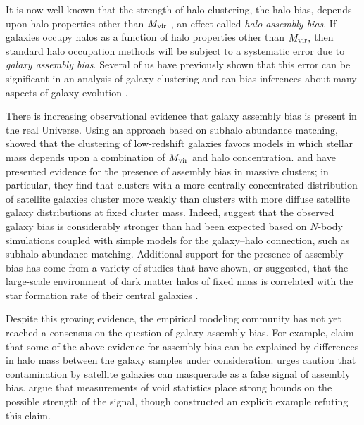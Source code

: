 \documentclass[usenatbib,usegraphicx,letterpaper]{mn2e}
\newcommand{\mvir}{M_{\rm vir}}
\begin{document}
It is now well known that the strength of halo clustering, the halo bias, 
depends upon halo properties other than $\mvir$
\citep[e.g.][]{gao_etal05,wechsler06,gao_white07,zentner07,dalal_etal08,lacerna11},
an effect called {\em halo assembly bias}. If galaxies occupy halos as a
function of halo properties other than $\mvir,$ then standard halo
occupation methods will be subject to a systematic error due to 
{\em galaxy assembly bias}. Several of us have previously shown 
that this error can be significant in an analysis of galaxy clustering 
and can bias inferences about many aspects of galaxy evolution \citep{zentner_etal14}.


There is increasing observational evidence that galaxy assembly bias is
present in the real Universe.
Using an approach based on subhalo abundance matching,
\citet{lehmann_etal15} showed that the clustering of low-redshift
galaxies favors models in which stellar mass depends upon a
combination of $\mvir$ and halo concentration.
\citet{miyatake_etal16} and \citet{more_etal16} have
presented evidence for the presence of assembly bias in massive
clusters; in particular, they find that clusters with a more centrally concentrated 
distribution of satellite galaxies cluster more weakly than clusters with more 
diffuse satellite galaxy distributions at fixed cluster mass. Indeed, \citet{more_etal16} 
suggest that the observed galaxy bias is considerably stronger than had been 
expected based on $N$-body simulations coupled with simple models for the 
galaxy--halo connection, such as subhalo abundance matching. 
Additional support for the presence of assembly bias has come from a
variety of studies that have shown, or suggested, that the large-scale
environment of dark matter halos of fixed mass
is correlated with the star formation rate of their central galaxies
\citep{yang_etal06a, blanton_berlind07,wang_etal08,wang_etal13,hearin_etal14}.


Despite this growing evidence, the empirical modeling community
has not yet reached a consensus on the question of galaxy assembly bias.
For example, \citet{lin_mandelbaum_etal15} claim that
some of the above evidence for assembly bias can be explained by
differences in halo mass between the galaxy samples under consideration.
\citet{paranjape15} urges caution that contamination by satellite galaxies
can masquerade as a false signal of assembly bias.
\citet{tinker08b} argue that measurements of void statistics place strong
bounds on the possible strength of the signal, though 
\citet{zentner_etal14} constructed an explicit example refuting this 
claim.
\end{document}
